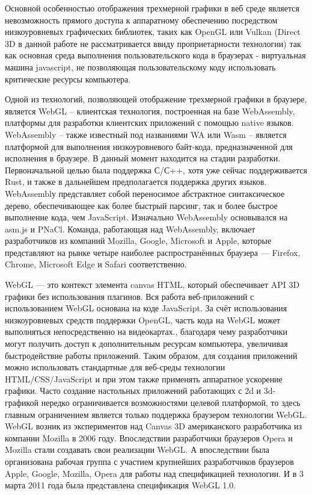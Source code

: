 Основной особенностью отображения трехмерной графики в веб среде является невозможность прямого доступа к аппаратному обеспечению
посредством низкоуровневых графических библиотек, таких как OpenGL или Vulkan (Direct 3D в данной работе не рассматривается ввиду
проприетарности технологии) так как основная среда выполнения пользовательского кода в браузерах - виртуальная машина javascript,
не позволяющая пользовательскому коду использовать критические ресурсы компьютера.

Одной из технологий, позволяющей отображение трехмерной графики в браузере, является WebGL -- клиентская технология, построенная на базе
WebAssembly, платформы для разработки клиентских приложений с помощью native языков. WebAssembly -- также известный под названиями WA
или Wasm -- является платформой для выполнения низкоуровневого байт-кода, предназначенной для исполнения в браузере. В данный момент находится
на стадии разработки. Первоначальной целью была поддержка С/С++, хотя уже сейчас поддерживается Rust, и также в дальнейшем предполагается
поддержка других языков. WebAssemblу представляет собой переносимое абстрактное синтаксическое дерево, обеспечивающее как более быстрый парсинг,
так и более быстрое выполнение кода, чем JavaScript\cite{js_web}. Изначально WebAssembly основывался на asm.js и PNaCl. Команда, работающая над WebAssembly,
включает разработчиков из компаний Mozilla, Google, Microsoft и Apple, которые представляют на рынке четыре наиболее распространённых браузера — Firefox,
Chrome, Microsoft Edge и Safari соответственно.

WebGL — это контекст элемента canvas HTML, который обеспечивает API 3D графики без использования плагинов. Вся работа веб-приложений с использованием WebGL основана на коде JavaScript.
За счёт использования низкоуровневых средств поддержки OpenGL, часть кода на WebGL может выполняться непосредственно на видеокартах., благодаря чему разработчики могут получить доступ
к дополнительным ресурсам компьютера, увеличивая быстродействие работы приложений.
Таким образом, для создания приложений можно использовать стандартные для веб-среды технологии HTML/CSS/JavaScript и при этом также применять аппаратное ускорение графики.
Часто создание настольных приложений работающих с 2d и 3d-графикой нередко ограничивается возможностями целевой платформой, то здесь главным ограничением является только поддержка
браузером технологии WebGL. 
WebGL возник из экспериментов над Canvas 3D американского разработчика из компании Mozilla в 2006 году. Впоследствии разработчики браузеров Opera и Mozilla стали создавать свои
реализации WebGL. А впоследствии была организована рабочая группа с участием крупнейших разработчиков браузеров Apple, Google, Mozilla, Opera для работы над спецификацией
технологии. И в 3 марта 2011 года была представлена спецификация WebGL 1.0.

